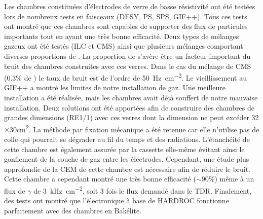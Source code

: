 Les chambres constituées d'électrodes de verre de basse résistivité ont été testées lors de nombreux tests en faisceaux (DESY, PS, SPS, GIF++). Tous ces tests ont montré que ces chambres sont capables de supporter des flux de particules importants tout en ayant une très bonne efficacité. Deux types de mélanges gazeux ont été testés (ILC et CMS) ainsi que plusieurs mélanges comportant diverses proportions de . La proportion de  s'avère être un facteur important du bruit des chambres construites avec ces verres. Dans le cas du mélange de CMS (\num{0.3}\% de ) le taux de bruit est de l'ordre de \SI{50}{\hertz\per\square\centi\meter}. Le vieillissement au GIF++ a montré les limites de notre installation de gaz. Une meilleure installation a été réalisée, mais les chambres avait déjà souffert de notre mauvaise installation. Deux solutions ont été apportées afin de construire des chambres de grandes dimensions (RE1/1) avec ces verres dont la dimension ne peut excéder \num{32}$\times$\num{30}\si{\square\centi\meter}. La méthode par fixation mécanique a été retenue car elle n'utilise pas de colle qui pourrait se dégrader au fil du temps et des radiations. L'étanchéité de cette chambre est également assurée par la cassette elle-même évitant ainsi le gonflement de la couche de gaz entre les électrodes. Cependant, une étude plus approfondie de la CEM de cette chambre est nécessaire afin de réduire le bruit. Cette chambre a cependant montré une très bonne efficacité ($\sim$\num{90}\%) même à un flux de $\gamma$ de \SI{3}{\kilo\hertz\per\square\centi\meter}, soit \num{3} fois le flux demandé dans le TDR. Finalement, des tests ont montré que l'électronique à base de HARDROC fonctionne parfaitement avec des chambres en Bakélite.